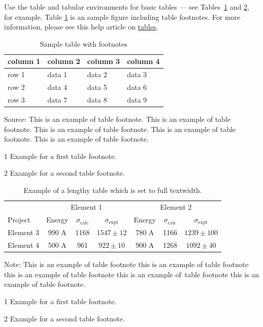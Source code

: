 \documentclass[12pt,a4paper]{article}
\begin{document}
Use the table and tabular environments for basic tables --- see Tables~\ref{tab1} and \ref{tab2}, for example. Table \ref{tab1} is an sample figure including table footnotes. For more information, please see this help article on \href{https://www.overleaf.com/learn/latex/tables}{tables}. 

\begin{table}[!ht]
\caption{Sample table with footnotes\label{tab1}}
\begin{threeparttable}
\begin{tabular*}{\columnwidth}{@{\extracolsep\fill}llll@{\extracolsep\fill}}
\toprule
column 1 & column 2 & column 3 & column 4\\
\midrule
row 1 & data 1 & data 2 & data 3 \\
row 2 & data 4 & data 5\tnote{1} & data 6 \\
row 3 & data 7 & data 8 & data 9\tnote{2} \\
\bottomrule
\end{tabular*}
\begin{tablenotes}
\item Source: This is an example of table footnote. This is an example of table footnote. This is an example of table footnote. This is an example of table footnote. This is an example of table footnote.
\item[1] Example for a first table footnote.
\item[2] Example for a second table footnote.
\end{tablenotes}
\end{threeparttable}
\end{table}

\begin{table}[!ht]
\caption{Example of a lengthy table which is set to full textwidth.\label{tab2}}
\tabcolsep=0pt
\begin{threeparttable}
\begin{tabular*}{\textwidth}{@{\extracolsep{\fill}}lcccccc@{\extracolsep{\fill}}}
\toprule
& \multicolumn{3}{c}{Element 1\tnote{1}} & \multicolumn{3}{c}{Element 2\tnote{2}} \\
\cmidrule(lr){2-4}\cmidrule(lr){5-7}
Project & Energy & $\sigma_{\mathrm{calc}}$ & $\sigma_{\mathrm{expt}}$ & Energy & $\sigma_{\mathrm{calc}}$ & $\sigma_{\mathrm{expt}}$ \\
\midrule
Element 3 & 990 A & 1168 & $1547\pm12$ & 780 A & 1166 & $1239\pm100$ \\
Element 4 & 500 A & 961 & $922\pm10$ & 900 A & 1268 & $1092\pm40$ \\
\bottomrule
\end{tabular*}
\begin{tablenotes}
\item Note: This is an example of table footnote this is an example of table footnote this is an example of table footnote this is an example of~table footnote this is an example of table footnote.
\item[1] Example for a first table footnote.
\item[2] Example for a second table footnote.
\end{tablenotes}
\end{threeparttable}
\end{table}
\end{document}

